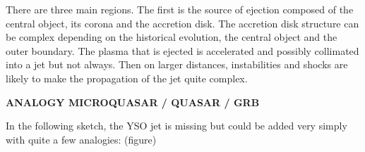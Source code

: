 \documentclass[10pt,a4paper,english,draft]{article}
\begin{document}
There are three main regions. The first is the source of ejection composed of the central object, its corona and the accretion disk. The accretion disk structure can be complex depending on the historical evolution, the central object and the outer boundary. The plasma that is ejected is accelerated and possibly collimated into a jet but not always. Then on larger distances, instabilities and shocks are likely to make the propagation of the jet quite complex.

\textbf{ANALOGY MICROQUASAR / QUASAR / GRB}

In the following sketch, the YSO jet is missing but could be added very simply with quite a few analogies: (figure)

\appendix

\makeatletter
\def\@seccntformat#1{Appendix~\csname the#1\endcsname:\quad}
\makeatother

\newpage




\listoffixmes
\end{document}
